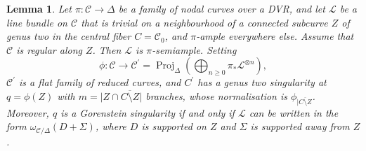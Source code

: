 \documentclass[11pt]{amsart}
\renewcommand{\to}{\rightarrow}
\newcommand{\dvr}{\Delta}
\newcommand{\Proj}{\operatorname{Proj}}
\theoremstyle{plain}
\newtheorem{lem}[thm]{Lemma}
\theoremstyle{definition}
\begin{document}
\begin{lem}\label{lem:contraction}
 Let $\pi\colon\mathcal C\to\dvr$ be a family of nodal curves over a DVR, and let $\mathcal L$ be a line bundle on $\mathcal C$ that is trivial \emph{on a neighbourhood} of a connected subcurve $Z$ of genus two in the central fiber $C=\mathcal C_0$, and $\pi$-ample everywhere else. Assume that $\mathcal C$ is regular along $Z$. Then $\mathcal L$ is $\pi$-semiample. Setting \[\phi\colon\mathcal C\to \mathcal C^\prime=\Proj_\dvr\left(\bigoplus_{n\geq0}\pi_*\mathcal L^{\otimes n}\right),\] $\mathcal C^\prime$ is a flat family of reduced curves, and $C^\prime$ has a genus two singularity at $q=\phi(Z)$ with $m=\lvert Z\cap\overline{C\setminus Z}\rvert$ branches, whose normalisation is $\phi_{\lvert\overline{C\setminus Z}}$. Moreover, $q$ is a Gorenstein singularity if and only if $\mathcal L$ can be written in the form $\omega_{\mathcal C/\dvr}(D+\Sigma)$, where $D$ is supported on $Z$ and $\Sigma$ is supported away from $Z$.
\end{lem}
\end{document}
